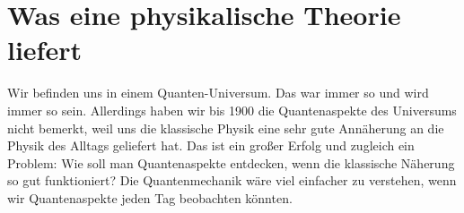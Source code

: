 %
%
%

\chapter{Was eine physikalische Theorie liefert}\label{c00}

Wir befinden uns in einem Quanten-Universum. Das war immer so und wird immer so sein.
Allerdings haben wir bis 1900 die Quantenaspekte des Universums nicht bemerkt, weil uns die
klassische Physik eine sehr gute Annäherung an die Physik des Alltags geliefert hat. Das ist
ein großer Erfolg und zugleich ein Problem: Wie soll man Quantenaspekte entdecken, wenn die
klassische Näherung so gut funktioniert? Die Quantenmechanik wäre viel einfacher zu
verstehen, wenn wir Quantenaspekte jeden Tag beobachten könnten.


